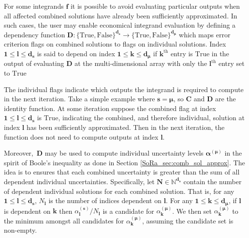 \documentclass[graybox]{svmult}
\begin{document}
For some integrands $\boldsymbol{f}$ it is possible to avoid evaluating particular outputs when all affected combined solutions have already been sufficiently approximated. In such cases, the user may enable economical integrand evaluation by defining a dependency function $\boldsymbol{D}: \{\text{True},\text{False}\}^{\boldsymbol{d}_{\boldsymbol{s}}} \to \{\text{True},\text{False}\}^{\boldsymbol{d}_{\boldsymbol{\mu}}}$ which maps error criterion flags on combined solutions to flags on individual solutions. Index $\boldsymbol{1} \leq \boldsymbol{l} \leq \boldsymbol{d}_{\boldsymbol{s}}$ is said to depend on index $\boldsymbol{1} \leq \boldsymbol{k} \leq \boldsymbol{d}_{\boldsymbol{\mu}}$ if $\boldsymbol{k}^\text{th}$ entry is $\text{True}$ in the output of evaluating $\boldsymbol{D}$ at the multi-dimensional array with only the $\boldsymbol{l}^\text{th}$ entry set to $\text{True}$

The individual flags indicate which outputs the integrand is required to compute in the next iteration. Take a simple example where $\boldsymbol{s}=\boldsymbol{\mu}$, so $\boldsymbol{C}$ and $\boldsymbol{D}$ are the identity function. At some iteration suppose the combined flag at index $\boldsymbol{1} \leq \boldsymbol{l} \leq \boldsymbol{d}_{\boldsymbol{s}}$ is $\text{True}$, indicating the combined, and therefore individual, solution at index $\boldsymbol{l}$ has been sufficiently approximated. Then in the next iteration, the function does not need to compute outputs at index $\boldsymbol{l}$.

Moreover, $\,\boldsymbol{D}$ may be used to compute individual uncertainty levels $\boldsymbol{\alpha}^{(\boldsymbol{\mu})}$ in the spirit of Boole's inequality as done in Section \ref{SoRa_sec:comb_sol_approx}. The idea is to ensures that each combined uncertainty is greater than the sum of all dependent individual uncertainties. Specifically, let $\boldsymbol{N} \in \mathbb{N}^{\boldsymbol{d}_{\boldsymbol{s}}}$ contain the number of dependent individual solutions for each combined solution. That is, for any $\boldsymbol{1} \leq \boldsymbol{l} \leq \boldsymbol{d}_{\boldsymbol{s}}$, $N_{\boldsymbol{l}}$ is the number of indices dependent on $\boldsymbol{l}$. For any $\boldsymbol{1} \leq \boldsymbol{k} \leq \boldsymbol{d}_{\boldsymbol{\mu}}$, if $\boldsymbol{l}$ is dependent on $\boldsymbol{k}$ then $\alpha_{\boldsymbol{l}}^{(\boldsymbol{s})}/N_{\boldsymbol{l}}$ is a candidate for $\alpha_{\boldsymbol{k}}^{(\boldsymbol{\mu})}$. We then set $\alpha_{\boldsymbol{k}}^{(\boldsymbol{\mu})}$ to the minimum amongst all candidates for $\alpha_{\boldsymbol{k}}^{(\boldsymbol{\mu})}$, assuming the candidate set is non-empty.
\end{document}
